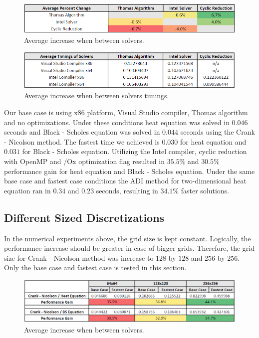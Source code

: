 \documentclass[12pt, oneside]{book}
\theoremstyle{plain}
\theoremstyle{definition}
\begin{document}
 \begin{figure}[!htb]
    \centering
        \includegraphics[scale=0.7]{solverAveragePercentage.png}
    \caption{Average increase when between solvers.}
\end{figure}
\begin{figure}[!htb]
    \centering
        \includegraphics[scale=0.6]{solverAverage.png}
    \caption{Average increase when between solvers timings.}
\end{figure}

Our base case is using x86 platform, Visual Studio compiler, Thomas algorithm and no optimizations. Under these conditions heat equation was solved in $0.046$ seconds and Black - Scholes equation was solved in $0.044$ seconds using the Crank - Nicolson method. The fastest time we achieved is $0.030$ for heat equation and $0.031$ for Black - Scholes equation. Utilizing the Intel compiler, cyclic reduction with OpenMP and /Ox optimization flag resulted in $35.5 \%$ and $30.5 \%$ performance gain for heat equation and Black - Scholes equation. Under the same base case and fastest case conditions the ADI method for two-dimensional heat equation ran in $0.34$ and $0.23$ seconds, resulting in $34.1 \%$ faster solutions.

\subsection{Different Sized Discretizations} 
In the numerical experiments above, the grid size is kept constant. Logically, the performance increase should be greater in case of bigger grids. Therefore, the grid size for Crank - Nicolson method was increase to $128$ by $128$ and $256$ by $256$. Only the base case and fastest case is tested in this section.

 \begin{figure}[!htb]
    \centering
        \includegraphics[scale=0.7]{gridTime.png}
    \caption{Average increase when between solvers.}
\end{figure}
\end{document}
